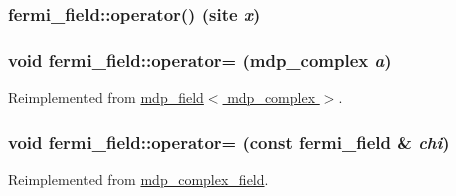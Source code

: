 \label{classfermi__field_adbdc4231bf39f4d4d350471d587b0bd0}
\hypertarget{classfermi__field_a51ed4094b715fe01490b027513b49861}{
\subsubsection[{operator()}]{ fermi\_\-field::operator() (site {\em x})}}
\label{classfermi__field_a51ed4094b715fe01490b027513b49861}
\hypertarget{classfermi__field_a1fb7ce7e54f45a334ee55dc7250aba89}{
\subsubsection[{operator=}]{\setlength{\rightskip}{0pt plus 5cm}void fermi\_\-field::operator= ({\bf mdp\_\-complex} {\em a})}}
\label{classfermi__field_a1fb7ce7e54f45a334ee55dc7250aba89}


Reimplemented from \hyperlink{classmdp__field_a24364bce6444668661a0688632af87ec}{mdp\_\-field$<$ mdp\_\-complex $>$}.\hypertarget{classfermi__field_abfaaf9b43f054fde18eaef3d80b1edf4}{
\subsubsection[{operator=}]{\setlength{\rightskip}{0pt plus 5cm}void fermi\_\-field::operator= (const {\bf fermi\_\-field} \& {\em chi})}}
\label{classfermi__field_abfaaf9b43f054fde18eaef3d80b1edf4}


Reimplemented from \hyperlink{classmdp__complex__field_ad2b736ae31e3ee1f955c10f6ad40928f}{mdp\_\-complex\_\-field}.

